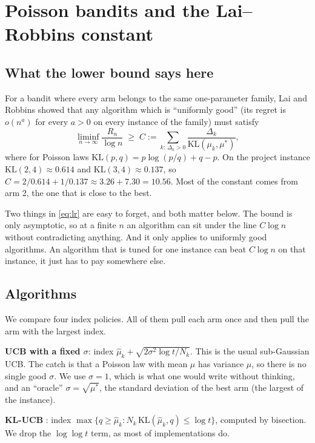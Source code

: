 \section{Poisson bandits and the Lai--Robbins constant}
\label{sec:bandits}

\subsection{What the lower bound says here}

For a bandit where every arm belongs to the same one-parameter family, Lai and Robbins \cite{lai1985} showed that any algorithm which is ``uniformly good'' (its regret is $o(n^a)$ for every $a > 0$ on every instance of the family) must satisfy
\begin{equation}
\liminf_{n\to\infty} \frac{R_n}{\log n} \;\ge\; C := \sum_{k:\,\Delta_k > 0} \frac{\Delta_k}{\mathrm{KL}(\mu_k, \mu^*)} ,
\label{eq:lr}
\end{equation}
where for Poisson laws $\mathrm{KL}(p, q) = p \log(p/q) + q - p$. On the project instance $\mathrm{KL}(2, 4) \approx 0.614$ and $\mathrm{KL}(3, 4) \approx 0.137$, so $C = 2/0.614 + 1/0.137 \approx 3.26 + 7.30 = 10.56$. Most of the constant comes from arm 2, the one that is close to the best.

Two things in \eqref{eq:lr} are easy to forget, and both matter below. The bound is only asymptotic, so at a finite $n$ an algorithm can sit under the line $C\log n$ without contradicting anything. And it only applies to uniformly good algorithms. An algorithm that is tuned for one instance can beat $C \log n$ on that instance, it just has to pay somewhere else.

\subsection{Algorithms}

We compare four index policies. All of them pull each arm once and then pull the arm with the largest index.

\textbf{UCB with a fixed $\sigma$}: index $\hat\mu_k + \sqrt{2\sigma^2 \log t / N_k}$. This is the usual sub-Gaussian UCB. The catch is that a Poisson law with mean $\mu$ has variance $\mu$, so there is no single good $\sigma$. We use $\sigma = 1$, which is what one would write without thinking, and an ``oracle'' $\sigma = \sqrt{\mu^*}$, the standard deviation of the best arm (the largest of the instance).

\textbf{KL-UCB} \cite{garivier2011, cappe2013}: index $\max\{q \ge \hat\mu_k : N_k \,\mathrm{KL}(\hat\mu_k, q) \le \log t\}$, computed by bisection. We drop the $\log\log t$ term, as most of implementations do.

